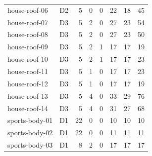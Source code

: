 \begin{longtable}{llrrrrrr}
house-roof-06 & D2 & 5 & 0 & 0 & 22 & 18 & 45\\
house-roof-07 & D3 & 5 & 2 & 0 & 27 & 23 & 54\\
house-roof-08 & D3 & 5 & 2 & 0 & 27 & 23 & 50\\
house-roof-09 & D3 & 5 & 2 & 1 & 17 & 17 & 19\\
house-roof-10 & D3 & 5 & 2 & 1 & 17 & 17 & 23\\
house-roof-11 & D3 & 5 & 1 & 0 & 17 & 17 & 23\\
house-roof-12 & D3 & 5 & 1 & 0 & 17 & 17 & 19\\
house-roof-13 & D3 & 5 & 4 & 0 & 33 & 29 & 76\\
house-roof-14 & D3 & 5 & 4 & 0 & 31 & 27 & 68\\
sports-body-01 & D1 & 22 & 0 & 0 & 10 & 10 & 10\\
sports-body-02 & D1 & 22 & 0 & 0 & 11 & 11 & 11\\
sports-body-03 & D1 & 8 & 2 & 0 & 17 & 17 & 17\\
\bottomrule\end{longtable}
